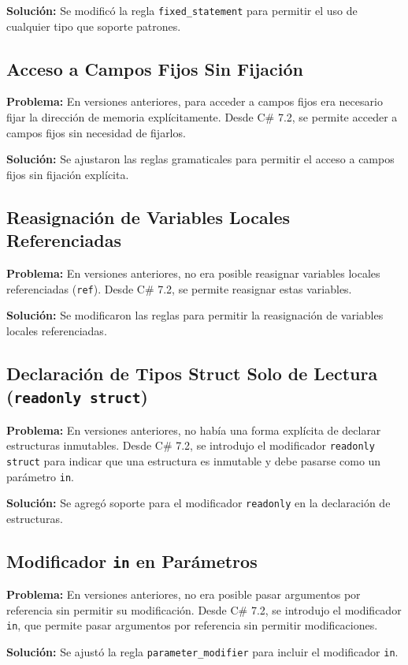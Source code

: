 \textbf{Solución:} Se modificó la regla \texttt{fixed\_statement} para permitir el uso de cualquier tipo que soporte patrones.

\subsection{Acceso a Campos Fijos Sin Fijación}
\textbf{Problema:} En versiones anteriores, para acceder a campos fijos era necesario fijar la dirección de memoria explícitamente. Desde C\# 7.2, se permite acceder a campos fijos sin necesidad de fijarlos.

\textbf{Solución:} Se ajustaron las reglas gramaticales para permitir el acceso a campos fijos sin fijación explícita.

\subsection{Reasignación de Variables Locales Referenciadas}
\textbf{Problema:} En versiones anteriores, no era posible reasignar variables locales referenciadas (\texttt{ref}). Desde C\# 7.2, se permite reasignar estas variables.

\textbf{Solución:} Se modificaron las reglas para permitir la reasignación de variables locales referenciadas.

\subsection{Declaración de Tipos Struct Solo de Lectura (\texttt{readonly struct})}
\textbf{Problema:} En versiones anteriores, no había una forma explícita de declarar estructuras inmutables. Desde C\# 7.2, se introdujo el modificador \texttt{readonly struct} para indicar que una estructura es inmutable y debe pasarse como un parámetro \texttt{in}.

\textbf{Solución:} Se agregó soporte para el modificador \texttt{readonly} en la declaración de estructuras.

\subsection{Modificador \texttt{in} en Parámetros}
\textbf{Problema:} En versiones anteriores, no era posible pasar argumentos por referencia sin permitir su modificación. Desde C\# 7.2, se introdujo el modificador \texttt{in}, que permite pasar argumentos por referencia sin permitir modificaciones.

\textbf{Solución:} Se ajustó la regla \texttt{parameter\_modifier} para incluir el modificador \texttt{in}.

